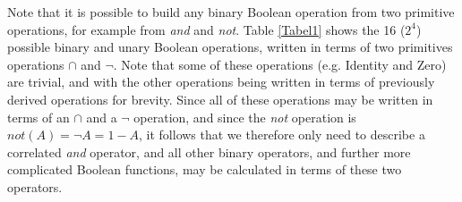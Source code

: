 \documentclass[runningheads]{llncs}
\begin{document}
Note that it is possible to build any binary Boolean operation from two primitive operations, for example from \textit{and} and \textit{not}. Table \ref{Tabel1} shows the 16 ($2^4$) possible binary and unary Boolean operations, written in terms of two primitives operations $\cap$ and $\neg$. Note that some of these operations (e.g. Identity and Zero) are trivial, and with the other operations being written in terms of previously derived operations for brevity. Since all of these operations may be written in terms of an $\cap$ and a $\neg$ operation, and since the \textit{not} operation is $not(A) = \neg A = 1 - A$, it follows that we therefore only need to describe a correlated \textit{and} operator, and all other binary operators, and further more complicated Boolean functions, may be calculated in terms of these two operators.
%
\begin{table}[!h]
\centering
\caption{Summary of the 16 possible binary and unary Boolean operations written in terms of two primitive operations $\cap$ and \neg.}
\end{table}
\end{document}

